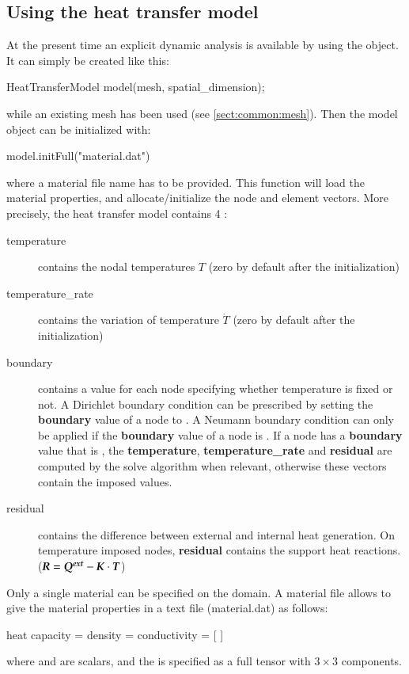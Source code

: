 \subsection{Using the heat transfer model}
At the present time an explicit dynamic analysis is available by
using the   object.
It can simply be created like this:
\begin{cpp}
  HeatTransferModel model(mesh, spatial_dimension);
\end{cpp}
while an existing mesh has been used (see \ref{sect:common:mesh}).
Then the model object can be initialized with:
\begin{cpp}
  model.initFull("material.dat")
\end{cpp}
where a material file name has to be provided. This function will load the material 
properties, and allocate/initialize the node and element vectors.
More precisely, the heat transfer model contains 4 :
\begin{description}
\item[temperature] contains the nodal temperatures $T$ (zero  by   default  after  the
  initialization) 
\item[temperature\_rate] contains the variation of temperature $\dot{T}$ 
  (zero  by   default  after  the
  initialization) 
\item[boundary]  contains a   value for  each  node
  specifying  whether  temperature is  fixed  or  not. A  Dirichlet  boundary
  condition can be prescribed by setting the \textbf{boundary} value of a node 
  to  .  A Neumann boundary condition  can only be applied
  if the  \textbf{boundary} value of a node is  . If a
  node has a  \textbf{boundary} value  that is  , the
  \textbf{temperature},     \textbf{temperature\_rate} and
  \textbf{residual} are computed by the solve algorithm when relevant, 
  otherwise these  vectors  contain   the  imposed  values.
\item[residual] contains the difference between external and internal heat generation. On
  temperature imposed nodes,  \textbf{residual} contains the support heat reactions. ($\boldsymbol{R} = \boldsymbol{Q^{ext}} -\boldsymbol{K} \cdot \boldsymbol{T}$)
\end{description}

Only a single material can be specified on the domain. 
A material file allows to give the material properties in a text file (\eg material.dat) as follows:
\begin{cpp}
  heat %
  capacity = %
  density = %
  conductivity = [%
  ]
\end{cpp}
where  and  are scalars, and the  is specified as a 
full tensor with $3\times 3$ components.

